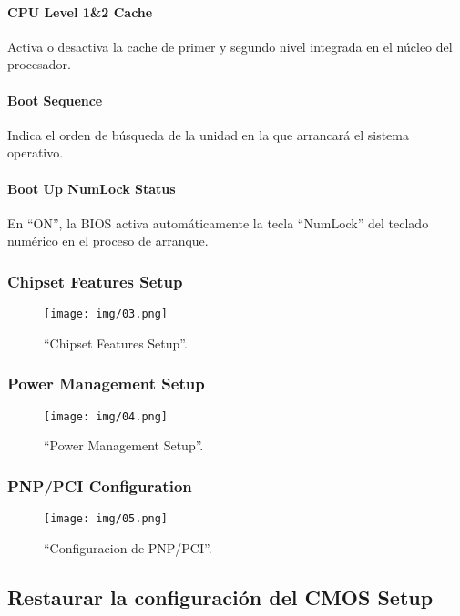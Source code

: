 \documentclass[12pt,oneside,a4paper]{article}
\begin{document}
			\paragraph{CPU Level 1\&2 Cache}
			Activa o desactiva la cache de primer y segundo nivel integrada en
			el núcleo del procesador.
			\paragraph{Boot Sequence}
			Indica el orden de búsqueda de la unidad en la que arrancará el
			sistema operativo.
			\paragraph{Boot Up NumLock Status}
			En ``ON'', la BIOS activa automáticamente la tecla ``NumLock'' del
			teclado numérico en el proceso de arranque.

		
		\subsubsection{Chipset Features Setup}{\label{sub:chipset features setup}}
			\begin{figure}[H]
				\centering
					\texttt{[image: img/03.png]}
				\caption{``Chipset Features Setup''.}
			\end{figure}

		\subsubsection{Power Management Setup}{\label{sub:power management setup}}
			\begin{figure}[H]
				\centering
					\texttt{[image: img/04.png]}
				\caption{``Power Management Setup''.}
			\end{figure}

		\subsubsection{PNP/PCI Configuration}{\label{sub:pnp/pci configuration}}
			\begin{figure}[H]
				\centering
					\texttt{[image: img/05.png]}
				\caption{``Configuracion de PNP/PCI''.}
			\end{figure}

		\newpage

	\subsection{Restaurar la configuración del CMOS Setup}{\label{sec:cmossetup/resetear-el-cmos-setup}}
\end{document}
